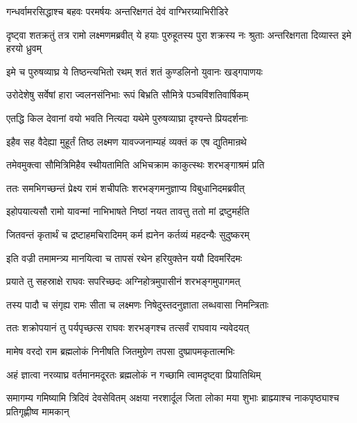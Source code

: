 \twolineshloka
{गन्धर्वामरसिद्धाश्च बहवः परमर्षयः}
{अन्तरिक्षगतं देवं वाग्भिरग्र्याभिरीडिरे} %

\threelineshloka
{दृष्ट्वा शतक्रतुं तत्र रामो लक्ष्मणमब्रवीत्}
{ये हयाः पुरुहूतस्य पुरा शक्रस्य नः श्रुताः}
{अन्तरिक्षगता दिव्यास्त इमे हरयो ध्रुवम्} %

\twolineshloka
{इमे च पुरुषव्याघ्र ये तिष्ठन्त्यभितो रथम्}
{शतं शतं कुण्डलिनो युवानः खड्गपाणयः} %

\twolineshloka
{उरोदेशेषु सर्वेषां हारा ज्वलनसंनिभाः}
{रूपं बिभ्रति सौमित्रे पञ्चविंशतिवार्षिकम्} %

\twolineshloka
{एतद्धि किल देवानां वयो भवति नित्यदा}
{यथेमे पुरुषव्याघ्रा दृश्यन्ते प्रियदर्शनाः} %

\twolineshloka
{इहैव सह वैदेह्या मुहूर्तं तिष्ठ लक्ष्मण}
{यावज्जनाम्यहं व्यक्तं क एष द्युतिमान्रथे} %

\twolineshloka
{तमेवमुक्त्वा सौमित्रिमिहैव स्थीयतामिति}
{अभिचक्राम काकुत्स्थः शरभङ्गाश्रमं प्रति} %

\twolineshloka
{ततः समभिगच्छन्तं प्रेक्ष्य रामं शचीपतिः}
{शरभङ्गमनुज्ञाप्य विबुधानिदमब्रवीत्} %

\twolineshloka
{इहोपयात्यसौ रामो यावन्मां नाभिभाषते}
{निष्ठां नयत तावत्तु ततो मां द्रष्टुमर्हति} %

\twolineshloka
{जितवन्तं कृतार्थं च द्रष्टाहमचिरादिमम्}
{कर्म ह्यनेन कर्तव्यं महदन्यैः सुदुष्करम्} %

\twolineshloka
{इति वज्री तमामन्त्र्य मानयित्वा च तापसं}
{रथेन हरियुक्तेन ययौ दिवमरिंदमः} %

\twolineshloka
{प्रयाते तु सहस्राक्षे राघवः सपरिच्छदः}
{अग्निहोत्रमुपासीनं शरभङ्गमुपागमत्} %

\twolineshloka
{तस्य पादौ च संगृह्य रामः सीता च लक्ष्मणः}
{निषेदुस्तदनुज्ञाता लब्धवासा निमन्त्रिताः} %

\twolineshloka
{ततः शक्रोपयानं तु पर्यपृच्छत्स राघवः}
{शरभङ्गश्च तत्सर्वं राघवाय न्यवेदयत्} %

\twolineshloka
{मामेष वरदो राम ब्रह्मलोकं निनीषति}
{जितमुग्रेण तपसा दुष्प्रापमकृतात्मभिः} %

\twolineshloka
{अहं ज्ञात्वा नरव्याघ्र वर्तमानमदूरतः}
{ब्रह्मलोकं न गच्छामि त्वामदृष्ट्वा प्रियातिथिम्} %

\threelineshloka
{समागम्य गमिष्यामि त्रिदिवं देवसेवितम्}
{अक्षया नरशार्दूल जिता लोका मया शुभाः}
{ब्राह्म्याश्च नाकपृष्ठ्याश्च प्रतिगृह्णीष्व मामकान्} %

